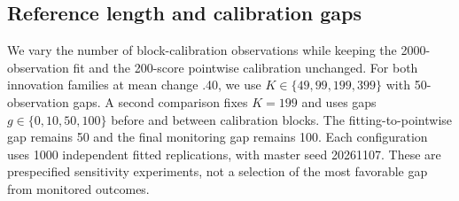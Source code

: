 \documentclass[11pt]{article}
\theoremstyle{definition}
\theoremstyle{remark}
\newcommand{\1}{\mathbf 1}
\begin{document}
\subsection{Reference length and calibration gaps}\label{subsec:sensitivity}\hypertarget{app:sensitivity}{}

We vary the number of block-calibration observations while keeping the 2000-observation fit and the 200-score pointwise calibration unchanged. For both innovation families at mean change .40, we use \(K\in\{49,99,199,399\}\) with 50-observation gaps. A second comparison fixes \(K=199\) and uses gaps \(g\in\{0,10,50,100\}\) before and between calibration blocks. The fitting-to-pointwise gap remains 50 and the final monitoring gap remains 100. Each configuration uses 1000 independent fitted replications, with master seed 20261107. These are prespecified sensitivity experiments, not a selection of the most favorable gap from monitored outcomes.
\end{document}
